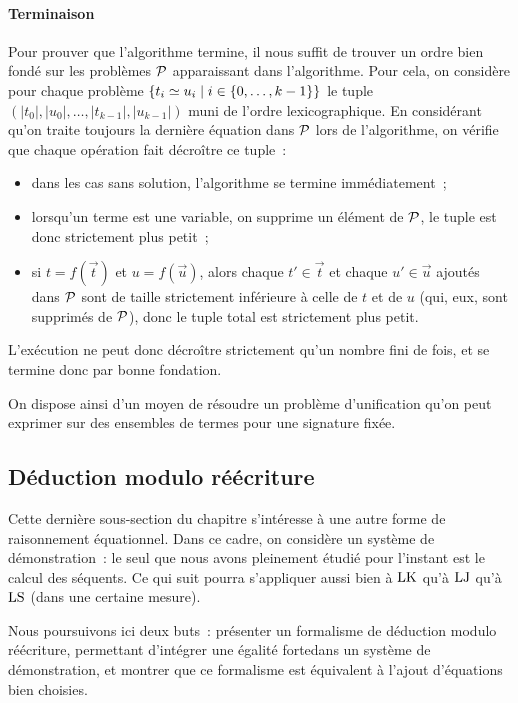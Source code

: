 \paragraph{Terminaison}
Pour prouver que l'algorithme termine, il nous suffit de trouver
un ordre bien fondé sur les problèmes $\mathcal{P}$ apparaissant dans
l'algorithme. Pour cela, on considère pour chaque problème
$\left\{ t_i\simeq u_i \;\middle\vert\; i \in \{0,\ldots,k - 1\} \right\}$ le tuple
$(|t_0|,|u_0|,\ldots,|t_{k-1}|,|u_{k-1}|)$ muni de l'ordre
lexicographique. En considérant qu'on traite toujours la dernière
équation dans $\mathcal{P}$ lors de l'algorithme, on vérifie que chaque
opération fait décroître ce tuple~:
\begin{itemize}
\item dans les cas sans solution, l'algorithme se termine immédiatement~;
\item lorsqu'un terme est une variable, on supprime un élément de $\mathcal{P}$,
  le tuple est donc strictement plus petit~;
\item si $t=f(\vec t)$ et $u = f(\vec u)$, alors chaque $t' \in \vec t$
  et chaque $u' \in \vec u$ ajoutés dans $\mathcal{P}$ sont de taille strictement
  inférieure à celle de $t$ et de $u$ (qui, eux, sont supprimés de $\mathcal{P}$),
  donc le tuple total est strictement plus petit.
\end{itemize}
L'exécution ne peut donc décroître strictement qu'un nombre fini de fois, et se
termine donc par bonne fondation.

On dispose ainsi d'un moyen de résoudre un problème d'unification qu'on
peut exprimer sur des ensembles de termes pour une signature fixée.

\subsection{Déduction modulo réécriture}\label{subsec.dedModTh}

Cette dernière sous-section du chapitre s'intéresse à une autre forme
de raisonnement équationnel. Dans ce cadre, on considère un système de
démonstration~: le seul que nous avons pleinement étudié pour l'instant
est le calcul des séquents. Ce qui suit pourra s'appliquer aussi bien à
$\operatorname{LK}$ qu'à $\operatorname{LJ}$ qu'à $\operatorname{LS}$ (dans une certaine mesure).

Nous poursuivons ici deux buts~: présenter un formalisme de déduction
modulo réécriture, permettant d'intégrer une égalité \og forte\fg dans
un système de démonstration, et montrer que ce formalisme est équivalent
à l'ajout d'équations bien choisies.

